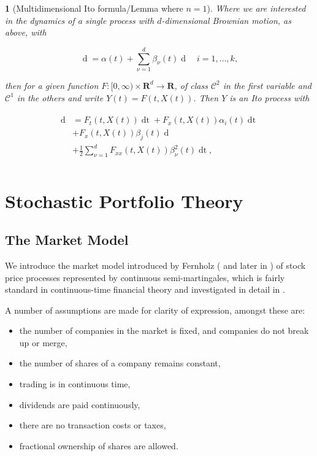 \documentclass[british]{amsart} \usepackage{lmodern}
\numberwithin{equation}{section} \numberwithin{figure}{section}
\theoremstyle{plain} \newtheorem{thm}{\protect\theoremname}[section]
\theoremstyle{definition} \newtheorem{defn}[thm]{\protect\definitionname}
\theoremstyle{plain} \newtheorem{assumption}[thm]{\protect\assumptionname}
\theoremstyle{plain} \newtheorem{lem}[thm]{\protect\lemmaname}
\theoremstyle{plain} \newtheorem{prop}[thm]{\protect\propositionname}
\theoremstyle{remark} \newtheorem{rem}[thm]{\protect\remarkname}
\theoremstyle{plain} \newtheorem{cor}[thm]{\protect\corollaryname}
\renewcommand{\d}[1]{\mathop{\mathrm{d}{#1}}}
\begin{document}
\begin{cor} [Multidimensional Ito formula/Lemma where $n=1$]
  Where we are interested in the dynamics of a single process
  with $d$-dimensional Brownian motion, as above, with

  \begin{equation}
    \d{X(t)} = \alpha(t) + \sum_{\nu=1}^d \beta_{\nu}(t)\d{W_{\nu}(t)}
    \quad i=1,\dots,k,
  \end{equation}

  then for a given function $F:[0,\infty) \times \mathbf{R}^d \to \mathbf{R}$, of
  class $\mathcal{C}^2$ in the first variable and $\mathcal{C}^1$ in the others
  and write $Y(t)=F(t,X(t))$. Then $Y$ is an Ito process with

  \begin{gather}
    \begin{split}
    \d{Y(t)} &= F_{t}(t, X(t))\d{t} + F_{x}(t,X(t)) \alpha_{i}(t)\d{t} \\
             & + F_{x}(t,X(t)) \beta_{j}(t)\d{W_{j}(t)} \\
             & + \frac{1}{2} \sum_{\nu=1}^d F_{xx}(t,X(t))
                \beta^{2}_{\nu}(t)\d{t},\\
    \end{split}
  \end{gather}
\end{cor}

\newpage
\section{Stochastic Portfolio Theory}

\subsection{The Market Model}

We introduce the market model introduced by Fernholz (\cite{fernholz1999pgf} and
later in \cite{fernholz2009}) of stock price processes represented by continuous
semi-martingales, which is fairly standard in continuous-time financial theory
and investigated in detail in \cite{karatzas1998}.

A number of assumptions are made for clarity of expression, amongst these are:

\begin{itemize}
  \item the number of companies in the market is fixed, and companies do not 
        break up or merge,
  \item the number of shares of a company remains constant,
  \item trading is in continuous time,
  \item dividends are paid continuously,
  \item there are no transaction costs or taxes,
  \item fractional ownership of shares are allowed.
\end{itemize}
\end{document}
